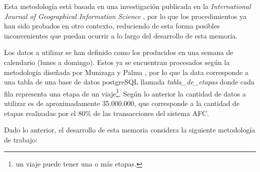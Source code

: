 \documentclass[12pt]{article}
\begin{document}

    Esta metodología está basada en una investigación publicada en la \textit{International Journal of Geographical Information Science} \cite{Estructura_urbana}, por lo que los procedimientos ya han sido probados en otro contexto, reduciendo de esta forma posibles inconvenientes que puedan ocurrir a lo largo del desarrollo de esta memoria. 

    Los datos a utilizar se han definido como los producidos en una semana de calendario (lunes a domingo). Estos ya se encuentran procesados según la metodología diseñada por Munizaga y Palma \cite{Procesamiento_datos}, por lo que la data corresponde a una tabla de una base de datos postgreSQL llamada \textit{tabla\_de\_etapas} donde cada fila representa una etapa de un viaje\footnote{un viaje puede tener una o más etapas.}. Según lo anterior la cantidad de datos a utilizar es de aproximadamente 35.000.000, que corresponde a la cantidad de etapas realizadas por el 80\% de las transacciones del sistema AFC.

    Dado lo anterior, el desarrollo de esta memoria considera la siguiente metodología de trabajo:
\end{document}
